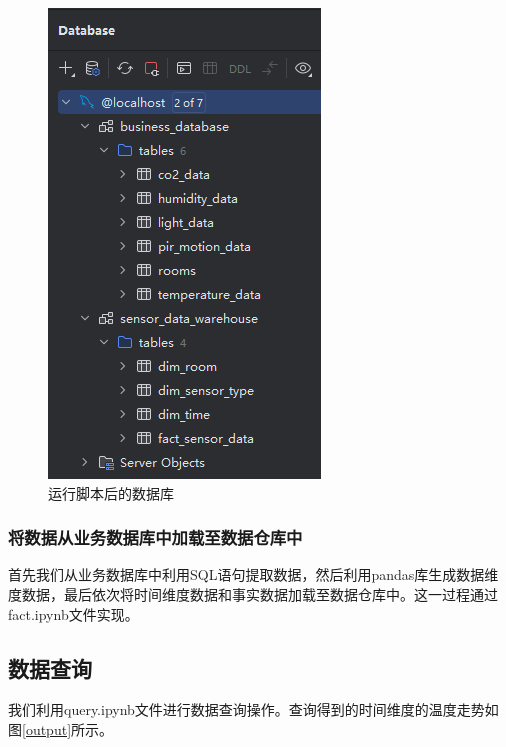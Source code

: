 \begin{figure}[!htbp]
    \centering
    \includegraphics[scale=1]{images/db2.png}
    \caption{运行脚本后的数据库}\label{db2}
\end{figure}

\subsubsection{将数据从业务数据库中加载至数据仓库中}

首先我们从业务数据库中利用SQL语句提取数据，然后利用pandas库生成数据维度数据，最后依次将时间维度数据和事实数据加载至数据仓库中。这一过程通过fact.ipynb文件实现。

\subsection{数据查询}

我们利用query.ipynb文件进行数据查询操作。查询得到的时间维度的温度走势如图\ref{output}所示。